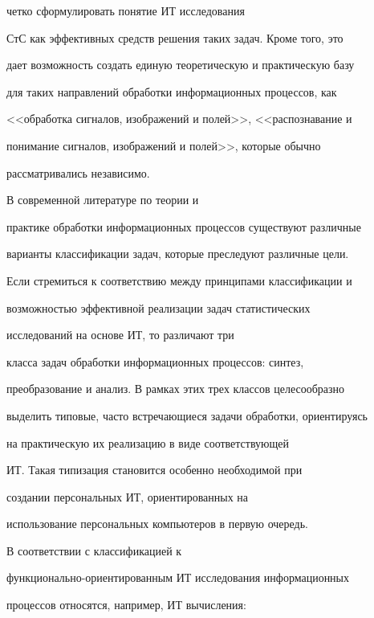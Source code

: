четко сформулировать понятие ИТ исследования


СтС как эффективных средств решения таких задач. Кроме того, это


дает возможность создать единую теоретическую и практическую базу


для таких направлений обработки информационных процессов, как


<<обработка сигналов, изображений и полей>>, <<распознавание и


понимание сигналов, изображений и полей>>, которые обычно


рассматривались независимо.





В современной литературе по теории и


практике обработки информационных процессов существуют различные


варианты классификации задач, которые преследуют различные цели.


Если стремиться к соответствию между принципами классификации и


возможностью эффективной реализации задач статистических


исследований на основе ИТ, то различают три


класса задач обработки информационных процессов: синтез,


преобразование и анализ. В рамках этих трех классов целесообразно


выделить типовые, часто встречающиеся задачи обработки, ориентируясь


на практическую их реализацию в виде соответствующей 


ИТ. Такая типизация становится особенно необходимой при


создании персональных ИТ, ориентированных на


использование персональных компьютеров в первую очередь.





В соответствии с классификацией  к


функционально-ориентированным ИТ исследования информационных


процессов  относятся, например, ИТ вычисления:


